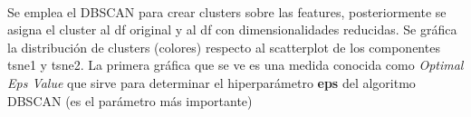 \documentclass[11pt]{article}
\begin{document}
    \begin{center}
    \end{center}
    { \hspace*{\fill} \\}
    
    Se emplea el DBSCAN para crear clusters sobre las features,
posteriormente se asigna el cluster al df original y al df con
dimensionalidades reducidas. Se gráfica la distribución de clusters
(colores) respecto al scatterplot de los componentes tsne1 y tsne2. La
primera gráfica que se ve es una medida conocida como \emph{Optimal Eps
Value} que sirve para determinar el hiperparámetro \textbf{eps} del
algoritmo DBSCAN (es el parámetro más importante)
\end{document}
